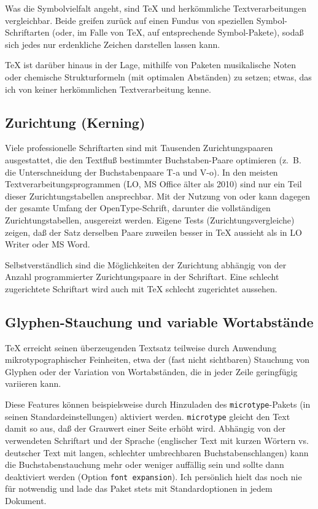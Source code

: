 \documentclass[11pt,a4paper,ngerman,DIV=8]{scrartcl}
\begin{document}
Was die Symbolvielfalt angeht, sind \TeX{} und herkömmliche Textverarbeitungen vergleichbar. Beide greifen zurück auf einen Fundus von speziellen Symbol-Schriftarten (oder, im Falle von \TeX{}, auf entsprechende Symbol-Pakete), sodaß sich jedes nur erdenkliche Zeichen darstellen lassen kann.

\TeX{} ist darüber hinaus in der Lage, mithilfe von Paketen musikalische Noten oder chemische Strukturformeln (mit optimalen Abständen) zu setzen; etwas, das ich von keiner herkömmlichen Textverarbeitung kenne.

\subsection{Zurichtung (Kerning)}

Viele professionelle Schriftarten sind mit Tausenden Zurichtungspaaren ausgestattet, die den Textfluß bestimmter Buchstaben-Paare optimieren (z.~B. die Unterschneidung der Buchstabenpaare T-a und V-o). In den meisten Textverarbeitungsprogrammen (LO, MS Office älter als 2010) sind nur ein Teil dieser Zurichtungstabellen ansprechbar. Mit der Nutzung von \XeTeX{} oder \LuaTeX{} kann dagegen der gesamte Umfang der OpenType-Schrift, darunter die vollständigen Zurichtungstabellen, ausgereizt werden. Eigene Tests (Zurichtungsvergleiche) zeigen, daß der Satz derselben Paare zuweilen besser in \TeX{} aussieht als in LO Writer oder MS Word.

Selbstverständlich sind die Möglichkeiten der Zurichtung abhängig von der Anzahl programmierter Zurichtungspaare in der Schriftart. Eine schlecht zugerichtete Schriftart wird auch mit \TeX{} schlecht zugerichtet aussehen.

\subsection{Glyphen-Stauchung und variable Wortabstände}

\TeX{} erreicht seinen überzeugenden Textsatz teilweise durch Anwendung mikrotypographischer Feinheiten, etwa der (fast nicht sichtbaren) Stauchung von Glyphen oder der Variation von Wortabständen, die in jeder Zeile geringfügig variieren kann.

Diese Features können beispielsweise durch Hinzuladen des \texttt{microtype}-Pakets (in seinen Standardeinstellungen) aktiviert werden. \texttt{microtype} gleicht den Text damit so aus, daß der Grauwert einer Seite erhöht wird. Abhängig von der verwendeten Schriftart und der Sprache (englischer Text mit kurzen Wörtern vs. deutscher Text mit langen, schlechter umbrechbaren Buchstabenschlangen) kann die Buchstabenstauchung mehr oder weniger auffällig sein und sollte dann deaktiviert werden (Option \texttt{font expansion}). Ich persönlich hielt das noch nie für notwendig und lade das Paket stets mit Standardoptionen in jedem Dokument.
\end{document}
